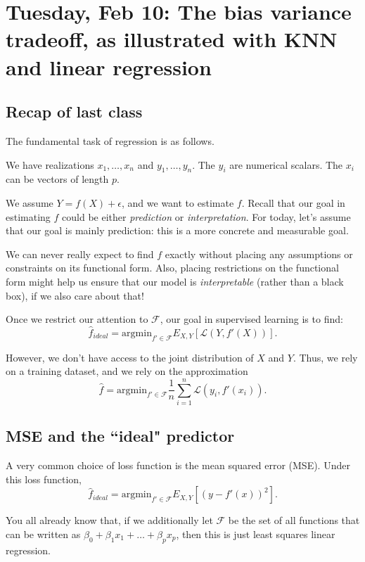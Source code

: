 \section{Tuesday, Feb 10: The bias variance tradeoff, as illustrated with KNN and linear regression}

\subsection{Recap of last class}

The fundamental task of regression is as follows. 

We have realizations $x_1,\ldots,x_n$ and $y_1,\ldots,y_n$. The $y_i$ are numerical scalars. The $x_i$ can be vectors of length $p$. 

We assume $Y = f(X) + \epsilon$, and we want to estimate $f$. Recall that our goal in estimating $f$ could be either \emph{prediction} or \emph{interpretation}. For today, let's assume that our goal is mainly prediction: this is a more concrete and measurable goal. 

We can never really expect to find $f$ exactly without placing any assumptions or constraints on its functional form. Also, placing restrictions on the functional form might help us ensure that our model is \emph{interpretable} (rather than a black box), if we also care about that!

Once we restrict our attention to $\mathcal{F}$, our goal in supervised learning is to find: 
$$
\hat{f}_{ideal} = \mathrm{argmin}_{f' \in \mathcal{F}} E_{X,Y} \left[ \mathcal{L}\left(Y, f'(X)\right)\right].
$$

However, we don't have access to the joint distribution of $X$ and $Y$. Thus, we rely on a training dataset, and we rely on the approximation
$$
\hat{f} = \mathrm{argmin}_{f' \in \mathcal{F}} \frac{1}{n} \sum_{i=1}^n\mathcal{L}\left(y_i, f'(x_i)\right).
$$

\subsection{MSE and the ``ideal" predictor}

A very common choice of loss function is the mean squared error (MSE). Under this loss function, 
$$
\hat{f}_{ideal} = \mathrm{argmin}_{f' \in \mathcal{F}} E_{X,Y} \left[\left( y - f'(x)\right)^2 \right].
$$

You all already know that, if we additionally let $\mathcal{F}$ be the set of all functions that can be written as $\beta_0+\beta_1 x_1 + \ldots + \beta_p x_p$, then this is just least squares linear regression.

